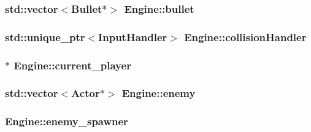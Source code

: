 \subsubsection[{bullet}]{\setlength{\rightskip}{0pt plus 5cm}std\+::vector$<${\bf Bullet}$\ast$$>$ Engine\+::bullet}\label{class_engine_a267b13093cb4ea1de9c297a96b0314ea}
\hypertarget{class_engine_a20fca6041ee94486e4ed1ec48d63dfef}{}
\subsubsection[{collision\+Handler}]{\setlength{\rightskip}{0pt plus 5cm}std\+::unique\+\_\+ptr$<${\bf Input\+Handler}$>$ Engine\+::collision\+Handler\hspace{0.3cm}{\ttfamily [protected]}}\label{class_engine_a20fca6041ee94486e4ed1ec48d63dfef}
\hypertarget{class_engine_ab488c2946ac31376f272acc1eaf815b7}{}
\subsubsection[{current\+\_\+player}]{$\ast$ Engine\+::current\+\_\+player\hspace{0.3cm}{\ttfamily [protected]}}\label{class_engine_ab488c2946ac31376f272acc1eaf815b7}
\hypertarget{class_engine_af5735da922e4f9fd64db49993dc8efe3}{}
\subsubsection[{enemy}]{\setlength{\rightskip}{0pt plus 5cm}std\+::vector$<${\bf Actor}$\ast$$>$ Engine\+::enemy}\label{class_engine_af5735da922e4f9fd64db49993dc8efe3}
\hypertarget{class_engine_ac38501b7527b3c8ce22f8b31a13821ea}{}
\subsubsection[{enemy\+\_\+spawner}]{ Engine\+::enemy\+\_\+spawner\hspace{0.3cm}{\ttfamily [protected]}}\label{class_engine_ac38501b7527b3c8ce22f8b31a13821ea}
\hypertarget{class_engine_abd0ff72a70b7643680cff6cd0513620f}{}
